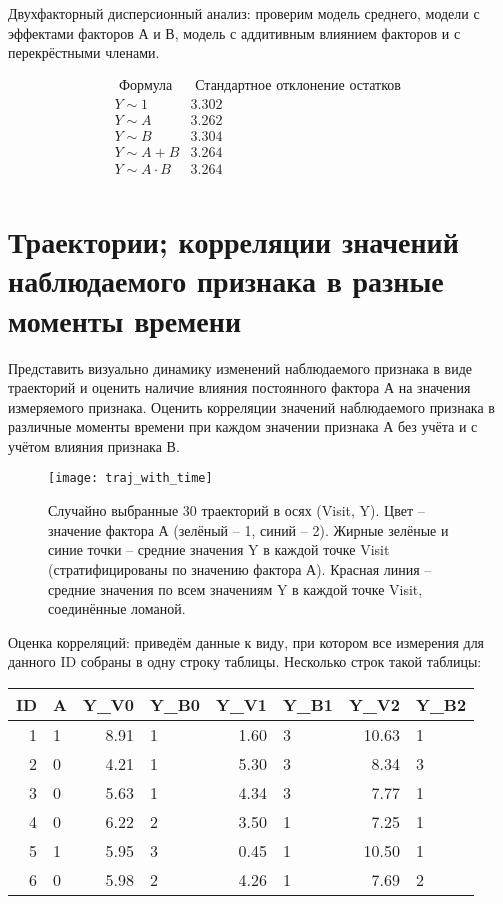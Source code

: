 \documentclass[a4paper,12pt]{article}
\begin{document}
Двухфакторный дисперсионный анализ: проверим модель среднего, модели с эффектами факторов А и В, модель с аддитивным влиянием факторов и с перекрёстными членами.

\[ 
\begin{array}{c|c}
	\text{ Формула } & \text{ Стандартное отклонение остатков } \\
	\hline
	Y \sim 1 & 3.302 \\
	Y \sim A & 3.262 \\
	Y \sim B & 3.304 \\
	Y \sim A + B & 3.264 \\
	Y \sim A \cdot B & 3.264 \\
\end{array}
\]


\section{ Траектории; корреляции значений наблюдаемого признака в разные моменты времени }
\label{section:trajectories}

\begin{leftbar}
Представить визуально динамику изменений наблюдаемого признака в виде траекторий и оценить наличие влияния постоянного фактора А на значения измеряемого признака.
Оценить корреляции значений наблюдаемого признака в различные моменты времени при каждом значении признака А без учёта и с учётом влияния признака В.
\end{leftbar}

\begin{figure}[H]
\label{img:traj_with_time}
\centering\texttt{[image: traj\_with\_time]}
\caption{ Случайно выбранные 30 траекторий в осях (Visit, Y). Цвет -- значение фактора А (зелёный -- 1, синий -- 2).
Жирные зелёные и синие точки -- средние значения Y в каждой точке Visit (стратифицированы по значению фактора А).
Красная линия -- средние значения по всем значениям Y в каждой точке Visit, соединённые ломаной.
}
\end{figure}

Оценка корреляций: приведём данные к виду, при котором все измерения для данного ID собраны в одну строку таблицы.
Несколько строк такой таблицы:

\begin{table}[H]
	\centering
	\begin{tabular}{rlrlrlrl}
		\hline
		ID & A & Y\_V0 & Y\_B0 & Y\_V1 & Y\_B1 & Y\_V2 & Y\_B2 \\ 
		\hline
		1 & 1 & 8.91 & 1 & 1.60 & 3 & 10.63 & 1 \\ 
		2 & 0 & 4.21 & 1 & 5.30 & 3 & 8.34 & 3 \\ 
		3 & 0 & 5.63 & 1 & 4.34 & 3 & 7.77 & 1 \\ 
		4 & 0 & 6.22 & 2 & 3.50 & 1 & 7.25 & 1 \\ 
		5 & 1 & 5.95 & 3 & 0.45 & 1 & 10.50 & 1 \\ 
		6 & 0 & 5.98 & 2 & 4.26 & 1 & 7.69 & 2 \\ 
		\hline
	\end{tabular}
\end{table}
\end{document}
